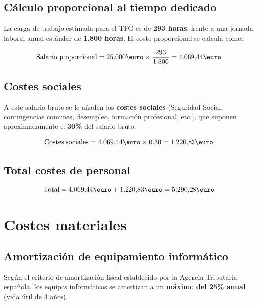 \subsection{Cálculo proporcional al tiempo dedicado}

La carga de trabajo estimada para el TFG es de \textbf{293 horas}, frente a una jornada laboral anual estándar de \textbf{1.800 horas}. El coste proporcional se calcula como:

\begin{equation}
	\text{Salario proporcional} = 25.000\text{\euro} \times \frac{293}{1.800} = 4.069{,}44\text{\euro}
\end{equation}

\subsection{Costes sociales}

A este salario bruto se le añaden los \textbf{costes sociales} (Seguridad Social, contingencias comunes, desempleo, formación profesional, etc.), que suponen aproximadamente el \textbf{30\%} del salario bruto:

\begin{equation}
	\text{Costes sociales} = 4.069{,}44\text{\euro} \times 0.30 = 1.220{,}83\text{\euro}
\end{equation}

\subsection{Total costes de personal}

\begin{equation}
	\text{Total} = 4.069{,}44\text{\euro} + 1.220{,}83\text{\euro} = 5.290{,}28\text{\euro}
\end{equation}

\section{Costes materiales}

\subsection{Amortización de equipamiento informático}

Según el criterio de amortización fiscal establecido por la Agencia Tributaria española, los equipos informáticos se amortizan a un \textbf{máximo del 25\% anual} (vida útil de 4 años).

